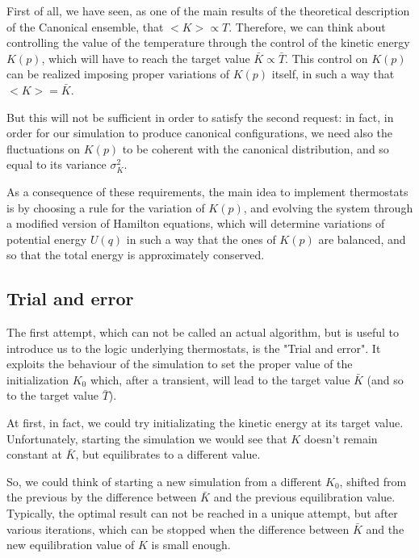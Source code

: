 First of all, we have seen, as one of the main results of the theoretical description of the Canonical ensemble, that \begin{math} <K> \propto T \end{math}. 
Therefore, we can think about controlling the value of the temperature through the control of the kinetic energy $K(p)$, which will have to reach the target value $\bar K \propto \bar T$. This control on $K(p)$ can be realized imposing proper variations of $K(p)$ itself, in such a way that $<K>= \bar K$. 

But this will not be sufficient in order to satisfy the second request: in fact, in order for our simulation to produce canonical configurations, we need also the fluctuations on $K(p)$ to be coherent with the canonical distribution, and so equal to its variance $\sigma_K^2$.

As a consequence of these requirements, the main idea to implement thermostats is by choosing a rule for the variation of $K(p)$, and evolving the system through a modified version of Hamilton equations, which will determine variations of potential energy $U(q)$ in such a way that the ones of $K(p)$ are balanced, and so that the total energy is approximately conserved.


\subsection{Trial and error}

The first attempt, which can not be called an actual algorithm, but is useful to introduce us to the logic underlying thermostats, is the "Trial and error". 
It exploits the behaviour of the simulation to set the proper value of the initialization $K_0$ which, after a transient, will lead to the target value \begin{math} \bar K \end{math} (and so to the target value \begin{math} \bar T \end{math}).

At first, in fact, we could try initializating the kinetic energy at its target value. Unfortunately, starting the simulation we would see that $K$ doesn't remain constant at $\bar K$, but equilibrates to a different value.

So, we could think of starting a new simulation from a different $K_0$, shifted from the previous by the difference between $\bar K$ and the previous equilibration value.
Typically, the optimal result can not be reached in a unique attempt, but after various iterations, which can be stopped when the difference between $\bar K$ and the new equilibration value of $K$ is small enough.

